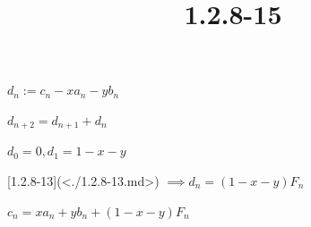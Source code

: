\documentclass{article}
\title{1.2.8-15}
\begin{document}
\maketitle

\( d_n := c_n - xa_n - yb_n \)

\( d_{n+2} = d_{n+1} + d_{n} \)

\( d_0 = 0, d_1 = 1 - x - y \)

[1.2.8-13](<./1.2.8-13.md>) \( \implies d_n = (1-x-y)F_n \)

\( c_n = xa_n + yb_n + (1-x-y)F_n \)
\end{document}
